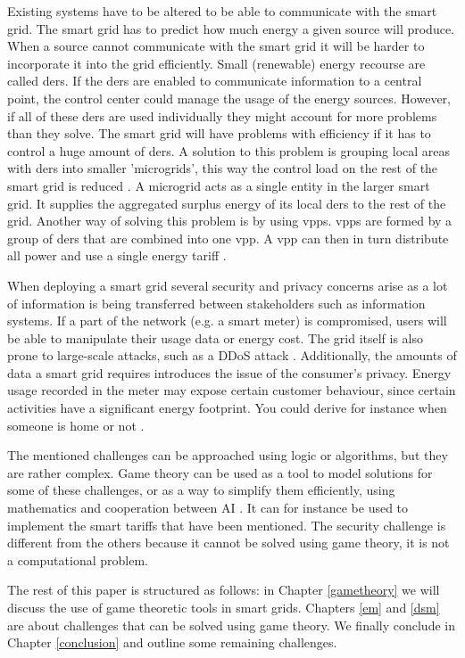 Existing systems have to be altered to be able to communicate with the smart grid.  The smart grid has to predict how much energy a given source will produce. When a source cannot communicate with the smart grid it will be harder to incorporate it into the grid efficiently. Small (renewable) energy recourse are called \acp{der}. If the \acp{der} are enabled to communicate information to a central point, the control center could manage the usage of the energy sources. However, if all of these \acp{der} are used individually they might account for more problems than they solve. The smart grid will have problems with efficiency if it has to control a huge amount of \acp{der}. A solution to this problem is grouping local areas with \acp{der} into smaller 'microgrids', this way the control load on the rest of the smart grid is reduced \cite{HatziargyriouAsanoIravaniMarnay2007}. A microgrid acts as a single entity in the larger smart grid. It supplies the aggregated surplus energy of its local \acp{der} to the rest of the grid. Another way of solving this problem is by using \acp{vpp}. \acp{vpp} are formed by a group of \acp{der} that are combined into one \ac{vpp}. A \ac{vpp} can then in turn distribute all power and use a single energy tariff \cite{NikonowiczMilewski2012}.

When deploying a smart grid several security and privacy concerns arise as a lot of information is being transferred between stakeholders such as information systems. If a part of the network (e.g. a smart meter) is compromised, users will be able to manipulate their usage data or energy cost. The grid itself is also prone to large-scale attacks, such as a DDoS attack \cite{McDanielMcLaughlin2009a}. Additionally, the amounts of data a smart grid requires introduces the issue of the consumer's privacy. Energy usage recorded in the meter may expose certain customer behaviour, since certain activities have a significant energy footprint. You could derive for instance when someone is home or not \cite{Molina-MarkhamShenoyFuEtAl2010}. 

The mentioned challenges can be approached using logic or algorithms, but they are rather complex. Game theory can be used as a tool to model solutions for some of these challenges, or as a way to simplify them efficiently, using mathematics and cooperation between AI \cite{myerson2013game}. It can for instance be used to implement the smart tariffs that have been mentioned. The security challenge is different from the others because it cannot be solved using game theory, it is not a computational problem.

The rest of this paper is structured as follows: in Chapter \ref{gametheory} we will discuss the use of game theoretic tools in smart grids. Chapters \ref{em} and \ref{dsm} are about challenges that can be solved using game theory. We finally conclude in Chapter \ref{conclusion} and outline some remaining challenges.